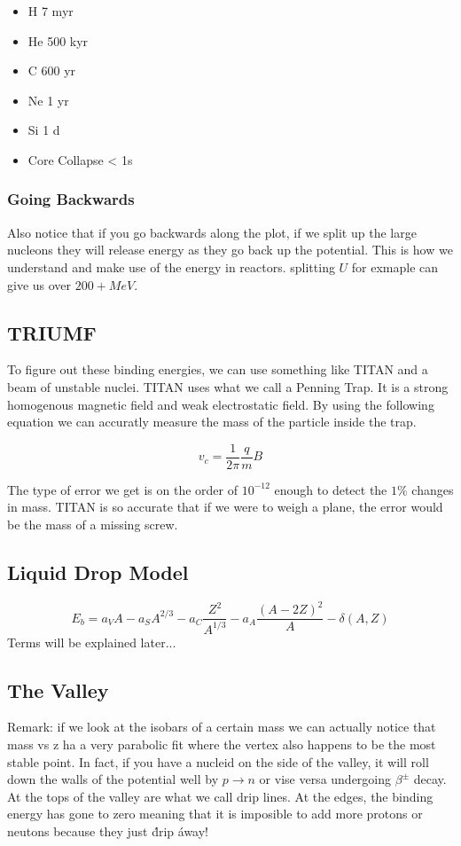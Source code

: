 \documentclass[english, 11pt]{article}
\begin{document}
      \begin{itemize}
        \item H 7 myr \
        \item He 500 kyr \
        \item C 600 yr \
        \item Ne 1 yr \
        \item Si 1 d \
        \item Core Collapse < 1s
      \end{itemize}

      \subsubsection*{Going Backwards}

      Also notice that if you go backwards along the plot, if we split up the large nucleons they will release energy as they go back up the potential. This is how we understand and make use of the energy in reactors. splitting $U$ for exmaple can give us over $200+ MeV$. 

      \subsection{TRIUMF}

      To figure out these binding energies, we can use something like TITAN and a beam of unstable nuclei. TITAN uses what we call a Penning Trap. It is a strong homogenous magnetic field and weak electrostatic field. By using the following equation we can accuratly measure the mass of the particle inside the trap.

      \[ v_c = \frac{1}{2\pi}\frac{q}{m}B\]

      The type of error we get is on the order of $10^{-12}$ enough to detect the $1\%$ changes in mass. TITAN is so accurate that if we were to weigh a plane, the error would be the mass of a missing screw.

      \subsection{Liquid Drop Model}
      \begin{defn}\label{ldm}
      \[ E_b = a_V A-a_S A^{2/3} - a_C \frac{Z^2}{A^{1/3}} - a_A \frac{(A-2Z)^2}{A} - \delta(A,Z) \]
      Terms will be explained later...
      \end{defn}

      \subsection{The Valley}
      Remark: if we look at the isobars of a certain mass we can actually notice that mass vs z ha a very parabolic fit where the vertex also happens to be the most stable point. In fact, if you have a nucleid on the side of the valley, it will roll down the walls of the potential well by $p \rightarrow n$ or vise versa undergoing $\beta^{\pm}$ decay. At the tops of the valley are what we call drip lines. At the edges, the binding energy has gone to zero meaning that it is imposible to add more protons or neutons because they just \' drip \' away!

  
\end{document}
